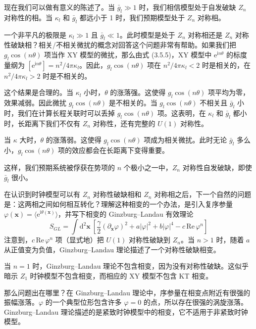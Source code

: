 现在我们可以做有意义的陈述了。当 $\bar{g}_{l} \gg 1$ 时，我们相信模型处于自发破缺 $Z_{n}$ 对称性的相。当 $\kappa_{l}$ 和 $\bar{g}_{l}$ 都远小于 1 时，我们预期模型处于 $Z_{n}$ 对称相。

一个非平凡的极限是 $\kappa_{l} \gg 1$ 且 $\bar{g}_{l} \ll 1$。此时模型是处于 $Z_{n}$ 对称相还是 $Z_{n}$ 对称性破缺相？相关/不相关微扰的概念对回答这个问题非常有帮助。如果我们把 $g_{l}\cos(n\theta)$ 项当作 XY 模型的微扰，那么由式 (3.5.5)，XY 模型中 $\mathrm{e}^{\mathrm{i}n\theta}$ 的标度量纲为 $[\mathrm{e}^{\mathrm{i}n\theta}] = n^{2}/4\pi\kappa_{l}$。因此，$g_{l}\cos(n\theta)$ 项在 $n^{2}/4\pi\kappa_{l} < 2$ 时是相关的，在 $n^{2}/4\pi\kappa_{l} > 2$ 时是不相关的。

这个结果是合理的。当 $\kappa_{l}$ 小时，$\theta$ 的涨落强。这使得 $g_{l}\cos(n\theta)$ 项平均为零，效果减弱。因此微扰 $g_{l}\cos(n\theta)$ 是不相关的。当 $g_{l}\cos(n\theta)$ 不相关且 $\bar{g}_{l}$ 小时，我们在计算长程关联时可以丢掉 $g_{l}\cos(n\theta)$ 项。这表明，在 $\kappa_{l}$ 和 $\bar{g}_{l}$ 都小时，长距离下我们不仅有 $Z_{n}$ 对称性，还有完整的 $U(1)$ 对称性。

当 $\kappa$ 大时，$\theta$ 的涨落弱。这使得 $g_{l}\cos(n\theta)$ 项成为相关微扰。此时无论 $\bar{g}_{l}$ 多么小，$g_{l}\cos(n\theta)$ 项的效应都会在长距离下变得重要。

这样，我们预期系统被俘获在势项的 $n$ 个极小之一中，$Z_{n}$ 对称性自发破缺，即使 $\bar{g}_{l}$ 很小。

在认识到时钟模型可以有 $Z_{n}$ 对称性破缺相和 $Z_{n}$ 对称相之后，下一个自然的问题是：这两相之间如何相互转化？理解这种相变的一个办法，是引入复序参量 $\varphi(\pmb{x}) = \langle \mathrm{e}^{\mathrm{i}\theta(\pmb{x})}\rangle$，并写下相变的 Ginzburg--Landau 有效理论
\begin{equation*}
S_{GL} = \int \mathrm{d}^{2}\pmb{x}\ \left[ \frac{\gamma}{2}(\partial_{\pmb{x}}\varphi)^{2} + a|\varphi|^{2} + b|\varphi|^{4} - c\,\mathrm{Re}\,\varphi^{n} \right]
\tag{3.5.7}
\end{equation*}
注意到，$c\,\mathrm{Re}\,\varphi^{n}$ 项（显式地）把 $U(1)$ 对称性破缺到 $Z_{n}$。当 $n > 1$ 时，随着 $a$ 从正值变为负值，Ginzburg--Landau 理论描述了一个对称性破缺相变。

当 $n = 1$ 时，Ginzburg--Landau 理论不包含相变，因为没有对称性破缺。这似乎暗示 $Z_{1}$ 时钟模型不包含相变，而相应的 XY 模型不包含 KT 相变。

那么问题出在哪里？在 Ginzburg--Landau 理论中，序参量在相变点附近有很强的振幅涨落。$\varphi$ 的一个典型位形包含许多 $\varphi = 0$ 的点，所以存在很强的涡旋涨落。Ginzburg--Landau 理论描述的是紧致时钟模型中的相变，它不适用于非紧致时钟模型。

